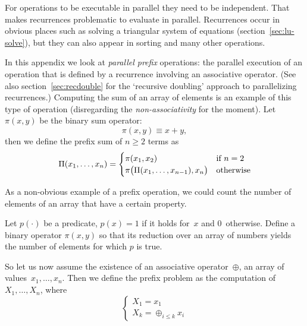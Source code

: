
For operations to be executable in parallel they need to be independent.
That makes recurrences problematic to evaluate in parallel.
Recurrences occur in obvious places such as solving a triangular system 
of equations (section~\ref{sec:lu-solve}),
but they can also appear in sorting and many other operations.

In this appendix we look at \emph{parallel prefix} operations: the
parallel execution of an operation that is defined by a recurrence
involving an associative operator.
(See also section~\ref{sec:recdouble} for the `recursive doubling'
approach to parallelizing recurrences.)
Computing the sum of an array of
elements is an example of this type of operation (disregarding the
\emph{non-associativity}%
for the moment).
Let $\pi(x,y)$ be the binary sum operator: \[ \pi(x,y)\equiv x+y, \]
then we define the prefix sum of $n\geq 2$ terms as
\[ \Pi(x_1,\ldots,x_n) =
\begin{cases}
\pi(x_1,x_2)&\hbox{if $n=2$}\\
\pi\bigl( \Pi(x_1,\ldots,x_{n-1}),x_n\bigr)&\hbox{otherwise} \\
\end{cases}
\]

As a non-obvious example of a prefix operation, we could count the number of elements
of an array that have a certain property.

\begin{exercise}
  Let $p(\cdot)$ be a predicate, $p(x)=1$ if it holds for~$x$
  and 0~otherwise. Define a binary operator $\pi(x,y)$ so that
  its reduction over an array of numbers yields the number of 
  elements for which $p$ is true.
\end{exercise}

So let us now assume the existence of an associative operator~$\oplus$,
an array of values~$x_1,\ldots,x_n$. Then we define the prefix problem
as the computation of $X_1,\ldots,X_n$, where
\[
\begin{cases}
  X_1=x_1\\
  X_k=\oplus_{i\leq k} x_i
\end{cases}
\]

